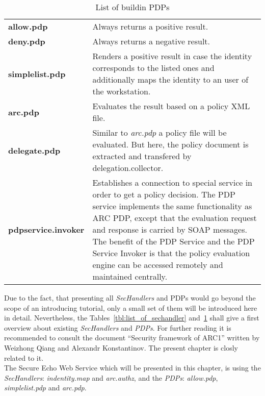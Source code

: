   \begin{table}[htb]
  \centering
  \caption{List of buildin PDPs}
\label{tbl:list_of_pdps}
  \begin{tabular*}{\textwidth}[t]{p{4cm}p{11cm}}
	\hline
 	\textbf{allow.pdp}           & Always returns a positive result.\\
	\textbf{deny.pdp}            & Always returns a negative result.\\
 	\textbf{simplelist.pdp}      & Renders a positive result in case the identity corresponds to the listed ones and additionally 
                                       maps the identity to an user of the workstation.\\
 	\textbf{arc.pdp}             & Evaluates the result based on a policy XML file.\\
 	\textbf{delegate.pdp}        & Similar to \textit{arc.pdp} a policy file will be evaluated. But here, the policy document is 
                                       extracted and transfered
                                       by delegation.collector.\\
 	\textbf{pdpservice.invoker}  & Establishes a connection to special service in order to get a policy decision. The PDP service 
                                       implements the same functionality as ARC PDP, except that the evaluation request and 
                                       response is carried by SOAP messages. The benefit of the PDP Service and the PDP Service
                                       Invoker is that the policy evaluation engine can be accessed remotely and maintained centrally.
\\
	\hline
  \end{tabular*}
  \end{table}
%
%
Due to the fact, that presenting all \textit{SecHandlers} and PDPs would go beyond the scope of an introducing tutorial, only a small set of them will be introduced here in detail. 
Nevertheless, the Tables~\ref{tbl:list_of_sechandler} and~\ref{tbl:list_of_pdps} shall give a first overview about existing \textit{SecHandlers} and \textit{PDPs}. For further reading it is recommended to consult the document ``Security framework of ARC1'' written by Weizhong Qiang and Alexandr Konstantinov. The present chapter is closly related to it.\\


The Secure Echo Web Service which will be presented in this chapter, is using the \textit{SecHandlers}: \textit{indentity.map} and \textit{arc.authz}, and the \textit{PDPs}: \textit{allow.pdp}, \textit{simplelist.pdp} and \textit{arc.pdp}. \\


